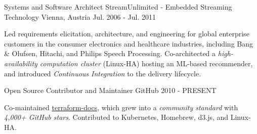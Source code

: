 \begin{cventries}
  \cventry
    {Systems and Software Architect} %
    {StreamUnlimited - Embedded Streaming Technology} %
    {Vienna, Austria} %
    {Jul. 2006 - Jul. 2011} %
    {
      \begin{cvprose}
      Led requirements elicitation, architecture, and engineering for global enterprise customers in the consumer electronics and healthcare industries, including Bang \& Olufsen, Hitachi, and Philips Speech Processing. Co-architected a \textit{high-availability computation cluster} (Linux-HA) hosting an ML-based recommender, and introduced \textit{Continuous Integration} to the delivery lifecycle.
      \end{cvprose}
    }

  \cventry
    {Open Source Contributor and Maintainer} %
    {GitHub} %
    {} %
    {2010 - PRESENT} %
    {
      \begin{cvprose}
      Co-maintained {\color{awesome}\href{https://github.com/terraform-docs/terraform-docs}{terraform-docs}}, which grew into a \textit{community standard} with \textit{4,000+ GitHub stars}. Contributed to Kubernetes, Homebrew, d3.js, and Linux-HA.
      \end{cvprose}
    }

\end{cventries}
